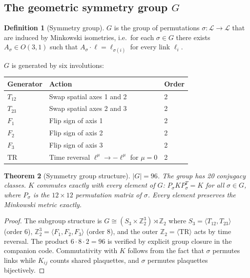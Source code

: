\documentclass[12pt,a4paper]{article}
\theoremstyle{plain}
\newtheorem{theorem}{Theorem}[section]
\theoremstyle{definition}
\newtheorem{definition}[theorem]{Definition}
\newcommand{\Z}{\mathbb{Z}}
\newcommand{\Lc}{\mathcal{L}}
\begin{document}
\subsection{The geometric symmetry group $G$}

\begin{definition}[Symmetry group]
  $G$ is the group of permutations $\sigma: \Lc \to \Lc$ that are induced
  by Minkowski isometries, i.e.\ for each $\sigma \in G$ there exists
  $A_\sigma \in O(3,1)$ such that $A_\sigma \cdot \ell = \ell_{\sigma(i)}$
  for every link $\ell_i$.
\end{definition}

$G$ is generated by six involutions:

\begin{center}
\begin{tabular}{lll}
\toprule
Generator & Action & Order \\
\midrule
$T_{12}$ & Swap spatial axes 1 and 2 & 2 \\
$T_{23}$ & Swap spatial axes 2 and 3 & 2 \\
$F_1$    & Flip sign of axis 1         & 2 \\
$F_2$    & Flip sign of axis 2         & 2 \\
$F_3$    & Flip sign of axis 3         & 2 \\
$\mathrm{TR}$   & Time reversal $\ell^\mu \to -\ell^\mu$ for $\mu=0$ & 2 \\
\bottomrule
\end{tabular}
\end{center}

\begin{theorem}[Symmetry group structure]
\label{thm:group}
  $|G| = 96$.  The group has 20 conjugacy classes.
  $K$ commutes exactly with every element of $G$:
  $P_\sigma K P_\sigma^T = K$ for all $\sigma \in G$,
  where $P_\sigma$ is the $12\times12$ permutation matrix of $\sigma$.
  Every element preserves the Minkowski metric exactly.
\end{theorem}

\begin{proof}
  The subgroup structure is $G \cong (S_3 \times \Z_2^3) \rtimes \Z_2$
  where $S_3 = \langle T_{12}, T_{23}\rangle$ (order 6),
  $\Z_2^3 = \langle F_1, F_2, F_3\rangle$ (order 8),
  and the outer $\Z_2 = \langle\mathrm{TR}\rangle$ acts by time reversal.
  The product $6 \cdot 8 \cdot 2 = 96$ is verified by explicit group
  closure in the companion code.  Commutativity with $K$ follows from
  the fact that $\sigma$ permutes links while $K_{ij}$ counts shared
  plaquettes, and $\sigma$ permutes plaquettes bijectively.
\end{proof}
\end{document}
